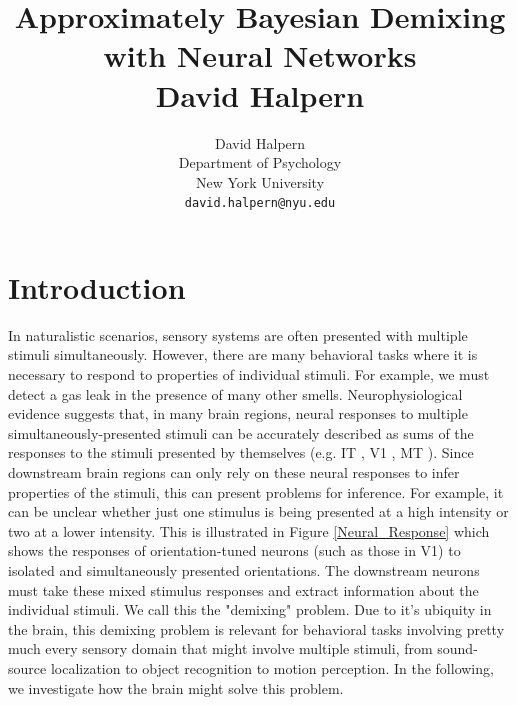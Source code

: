 \documentclass{article} %
\title{Approximately Bayesian Demixing with Neural Networks \\ David Halpern}
\author{
David Halpern\\
Department of Psychology\\
New York University\\
\texttt{david.halpern@nyu.edu} \\
}
\begin{document}
\maketitle


\section{Introduction}
In naturalistic scenarios, sensory systems are often presented with multiple stimuli simultaneously. However, there are many behavioral tasks where it is necessary to respond to properties of individual stimuli. For example, we must detect a gas leak in the presence of many other smells. Neurophysiological evidence suggests that, in many brain regions, neural responses to multiple simultaneously-presented stimuli can be accurately described as sums of the responses to the stimuli presented by themselves (e.g. IT \cite{Zoccolan07112007}, V1 \cite{Busse2009}, MT \cite{Britten15061999}).  Since downstream brain regions can only rely on these neural responses to infer properties of the stimuli, this can present problems for inference. For example, it can be unclear whether just one stimulus is being presented at a high intensity or two at a lower intensity. 
This is illustrated in Figure \ref{Neural_Response} which shows the responses of orientation-tuned neurons (such as those in V1) to isolated and simultaneously presented orientations. The downstream neurons must take these mixed stimulus responses and extract information about the individual stimuli. We call this the "demixing" problem. Due to it's ubiquity in the brain, this demixing problem is relevant for behavioral tasks involving pretty much every sensory domain that might involve multiple stimuli, from sound-source localization to object recognition to motion perception. In the following, we investigate how the brain might solve this problem.
\end{document}
